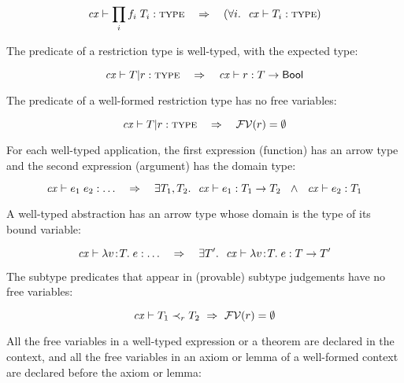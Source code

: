 \begin{theorem}\label{thm-trec-inv}
\[
\istyO{\trecO}\ \ \IMPLIES\ \ (\FORALL{i}{\istyO{\typ_i}})
\]
\end{theorem}


The predicate of a restriction type is well-typed, with the expected type:

\begin{theorem}\label{thm-tspred-wt}
\[
\istyO{\tsubO}\ \ \IMPLIES\ \ \hastyO{\tspred}{\tarr{\typ}{\bool}}
\]
\end{theorem}

The predicate of a well-formed restriction type has no free variables:

\begin{theorem}\label{thm-no-free-vars-in-types}
\[
\istyO{\tsubO}\ \ \IMPLIES\ \ \efvar{\tspred}=\emptyset
\]
\end{theorem}

For each well-typed application, the first expression (function) has an arrow
type and the second expression (argument) has the domain type:

\begin{theorem}\label{thm-eapp-inv}
\[
\hastyOany{\appO}
\ \ \IMPLIES\ \ 
\EXISTS{\typ_1,\typ_2}
       {\hastyO{\expr_1}{\tarrO}\ \AND\ \hastyO{\expr_2}{\typ_1}}
\]
\end{theorem}

A well-typed abstraction has an arrow type whose domain is the type of its
bound variable:

\begin{theorem}\label{thm-abs-arrty}
\[
\mathit{cx}\vdash\lambda v\!:\!T.\;e:\ldots
\ \ \ \Rightarrow\ \ \
\exists T'.\ \ \mathit{cx}\vdash\lambda v\!:\!T.\;e:T\to T'
\]
\end{theorem}

The subtype predicates that appear in (provable) subtype judgements have no
free variables:

\begin{theorem}\label{thm-subpred-no-free-vars}
\[
\mathit{cx}\vdash T_1\prec_{r}T_2\ \Rightarrow\ \mathcal{FV}(r)=\emptyset
\]
\end{theorem}

All the free variables in a well-typed expression or a theorem are declared in
the context, and all the free variables in an axiom or lemma of a well-formed
context are declared before the axiom or lemma:

